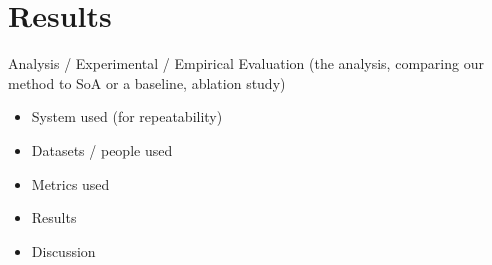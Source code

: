 \section{Results}
Analysis / Experimental / Empirical Evaluation (the analysis, comparing our method to SoA or a baseline, ablation study)
\begin{itemize}
    \item System used (for repeatability)
    \item Datasets / people used
    \item Metrics used
    \item Results
    \item Discussion
\end{itemize}

